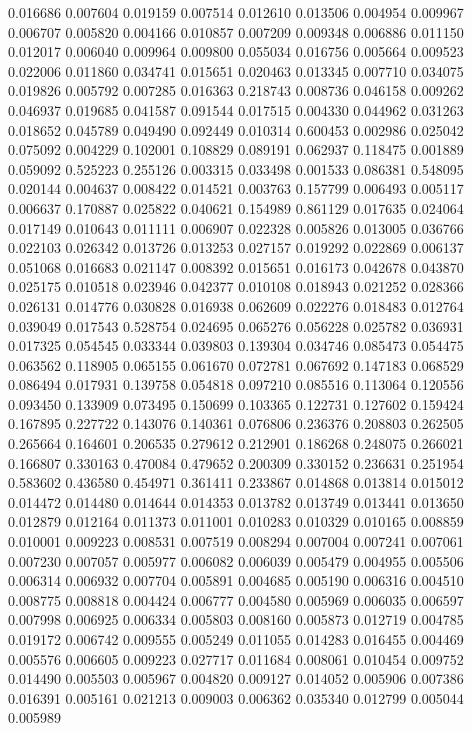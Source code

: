 0.016686
0.007604
0.019159
0.007514
0.012610
0.013506
0.004954
0.009967
0.006707
0.005820
0.004166
0.010857
0.007209
0.009348
0.006886
0.011150
0.012017
0.006040
0.009964
0.009800
0.055034
0.016756
0.005664
0.009523
0.022006
0.011860
0.034741
0.015651
0.020463
0.013345
0.007710
0.034075
0.019826
0.005792
0.007285
0.016363
0.218743
0.008736
0.046158
0.009262
0.046937
0.019685
0.041587
0.091544
0.017515
0.004330
0.044962
0.031263
0.018652
0.045789
0.049490
0.092449
0.010314
0.600453
0.002986
0.025042
0.075092
0.004229
0.102001
0.108829
0.089191
0.062937
0.118475
0.001889
0.059092
0.525223
0.255126
0.003315
0.033498
0.001533
0.086381
0.548095
0.020144
0.004637
0.008422
0.014521
0.003763
0.157799
0.006493
0.005117
0.006637
0.170887
0.025822
0.040621
0.154989
0.861129
0.017635
0.024064
0.017149
0.010643
0.011111
0.006907
0.022328
0.005826
0.013005
0.036766
0.022103
0.026342
0.013726
0.013253
0.027157
0.019292
0.022869
0.006137
0.051068
0.016683
0.021147
0.008392
0.015651
0.016173
0.042678
0.043870
0.025175
0.010518
0.023946
0.042377
0.010108
0.018943
0.021252
0.028366
0.026131
0.014776
0.030828
0.016938
0.062609
0.022276
0.018483
0.012764
0.039049
0.017543
0.528754
0.024695
0.065276
0.056228
0.025782
0.036931
0.017325
0.054545
0.033344
0.039803
0.139304
0.034746
0.085473
0.054475
0.063562
0.118905
0.065155
0.061670
0.072781
0.067692
0.147183
0.068529
0.086494
0.017931
0.139758
0.054818
0.097210
0.085516
0.113064
0.120556
0.093450
0.133909
0.073495
0.150699
0.103365
0.122731
0.127602
0.159424
0.167895
0.227722
0.143076
0.140361
0.076806
0.236376
0.208803
0.262505
0.265664
0.164601
0.206535
0.279612
0.212901
0.186268
0.248075
0.266021
0.166807
0.330163
0.470084
0.479652
0.200309
0.330152
0.236631
0.251954
0.583602
0.436580
0.454971
0.361411
0.233867
0.014868
0.013814
0.015012
0.014472
0.014480
0.014644
0.014353
0.013782
0.013749
0.013441
0.013650
0.012879
0.012164
0.011373
0.011001
0.010283
0.010329
0.010165
0.008859
0.010001
0.009223
0.008531
0.007519
0.008294
0.007004
0.007241
0.007061
0.007230
0.007057
0.005977
0.006082
0.006039
0.005479
0.004955
0.005506
0.006314
0.006932
0.007704
0.005891
0.004685
0.005190
0.006316
0.004510
0.008775
0.008818
0.004424
0.006777
0.004580
0.005969
0.006035
0.006597
0.007998
0.006925
0.006334
0.005803
0.008160
0.005873
0.012719
0.004785
0.019172
0.006742
0.009555
0.005249
0.011055
0.014283
0.016455
0.004469
0.005576
0.006605
0.009223
0.027717
0.011684
0.008061
0.010454
0.009752
0.014490
0.005503
0.005967
0.004820
0.009127
0.014052
0.005906
0.007386
0.016391
0.005161
0.021213
0.009003
0.006362
0.035340
0.012799
0.005044
0.005989
